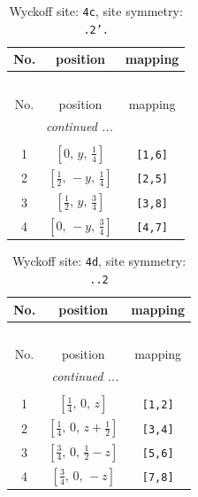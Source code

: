 \documentclass[fleqn,8pt]{jsarticle}
\begin{document}
\renewcommand{\arraystretch}{1.2}
\begin{longtable}{ccc}
\caption{Wyckoff site: {\tt 4c}, site symmetry: {\tt .2'.}}
 \\
 \hline \hline
No. & position & mapping \\ \hline \endfirsthead

\multicolumn{2}{l}{\tablename\ \thetable{}} \\
 \hline \hline
No. & position & mapping \\ \hline \endhead

 \hline \hline
\multicolumn{2}{r}{\footnotesize\it continued ...} \\ \endfoot

 \hline \hline
\multicolumn{2}{r}{} \\ \endlastfoot

1 & $\left[ 0,\, y,\, \frac{1}{4} \right]$ & {\tt [1,6]} \\ \hline
2 & $\left[ \frac{1}{2},\, - y,\, \frac{1}{4} \right]$ & {\tt [2,5]} \\ \hline
3 & $\left[ \frac{1}{2},\, y,\, \frac{3}{4} \right]$ & {\tt [3,8]} \\ \hline
4 & $\left[ 0,\, - y,\, \frac{3}{4} \right]$ & {\tt [4,7]} \\
\end{longtable}
\renewcommand{\arraystretch}{1.2}
\begin{longtable}{ccc}
\caption{Wyckoff site: {\tt 4d}, site symmetry: {\tt ..2}}
 \\
 \hline \hline
No. & position & mapping \\ \hline \endfirsthead

\multicolumn{2}{l}{\tablename\ \thetable{}} \\
 \hline \hline
No. & position & mapping \\ \hline \endhead

 \hline \hline
\multicolumn{2}{r}{\footnotesize\it continued ...} \\ \endfoot

 \hline \hline
\multicolumn{2}{r}{} \\ \endlastfoot

1 & $\left[ \frac{1}{4},\, 0,\, z \right]$ & {\tt [1,2]} \\ \hline
2 & $\left[ \frac{1}{4},\, 0,\, z + \frac{1}{2} \right]$ & {\tt [3,4]} \\ \hline
3 & $\left[ \frac{3}{4},\, 0,\, \frac{1}{2} - z \right]$ & {\tt [5,6]} \\ \hline
4 & $\left[ \frac{3}{4},\, 0,\, - z \right]$ & {\tt [7,8]} \\
\end{longtable}
\end{document}
